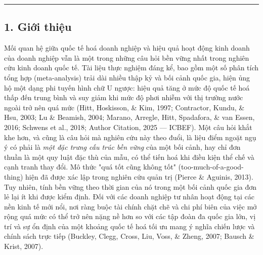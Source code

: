 \documentclass[12pt,a4paper]{article}
\begin{document}
\begin{center}\rule{0.5\linewidth}{0.5pt}\end{center}

\hypertarget{1-giux1edbi-thiux1ec7u}{%
\subsection{1. Giới thiệu}\label{1-giux1edbi-thiux1ec7u}}

Mối quan hệ giữa quốc tế hoá doanh nghiệp và hiệu quả hoạt động kinh
doanh của doanh nghiệp vẫn là một trong những câu hỏi bền vững nhất
trong nghiên cứu kinh doanh quốc tế. Tài liệu thực nghiệm đáng kể, bao
gồm một số phân tích tổng hợp (meta-analysis) trải dài nhiều thập kỷ và
bối cảnh quốc gia, hiện ủng hộ một dạng phi tuyến hình chữ U ngược: hiệu
quả tăng ở mức độ quốc tế hoá thấp đến trung bình và suy giảm khi mức độ
phơi nhiễm với thị trường nước ngoài trở nên quá mức (Hitt, Hoskisson,
\& Kim, 1997; Contractor, Kundu, \& Hsu, 2003; Lu \& Beamish, 2004;
Marano, Arregle, Hitt, Spadafora, \& van Essen, 2016; Schwens et al.,
2018; Author Citation, 2025 --- ICBEF). Một câu hỏi khắt khe hơn, và
cũng là câu hỏi mà nghiên cứu này theo đuổi, là liệu điểm ngoặt ngụ ý có
phải là \emph{một đặc trưng cấu trúc bền vững} của một bối cảnh, hay chỉ
đơn thuần là một quy luật đặc thù của mẫu, có thể tiến hoá khi điều kiện
thể chế và cạnh tranh thay đổi. Mô thức "quá tốt cũng không tốt"
(too-much-of-a-good-thing) hiện đã được xác lập trong nghiên cứu quản
trị (Pierce \& Aguinis, 2013). Tuy nhiên, tính bền vững theo thời gian
của nó trong một bối cảnh quốc gia đơn lẻ lại ít khi được kiểm định. Đối
với các doanh nghiệp tư nhân hoạt động tại các nền kinh tế mới nổi, nơi
ràng buộc tài chính chặt chẽ và chi phí biên của việc mở rộng quá mức có
thể trở nên nặng nề hơn so với các tập đoàn đa quốc gia lớn, vị trí và
sự ổn định của một khoảng quốc tế hoá tối ưu mang ý nghĩa chiến lược và
chính sách trực tiếp (Buckley, Clegg, Cross, Liu, Voss, \& Zheng, 2007;
Bausch \& Krist, 2007).
\end{document}
